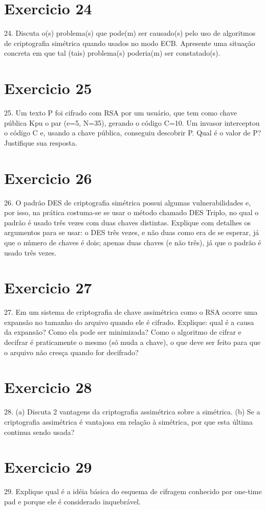 \documentclass[10pt,a4paper]{report}
\begin{document}
\section{Exercicio 24}
24. Discuta o(s) problema(s) que pode(m) ser causado(s) pelo uso de algoritmos de criptografia simétrica quando usados no modo ECB. Apresente uma situação concreta em que tal (tais) problema(s) poderia(m) ser constatado(s).
\section{Exercicio 25}
25. Um texto P foi cifrado com RSA por um usuário, que tem como chave pública Kpu o par (e=5, N=35), gerando o código C=10. Um invasor interceptou o código C e, usando a chave pública, conseguiu descobrir P. Qual é o valor de P? Justifique sua resposta.
\section{Exercicio 26}
26. O padrão DES de criptografia simétrica possui algumas vulnerabilidades e, por isso, na prática costuma-se se usar o método chamado DES Triplo, no qual o padrão é usado três vezes com duas chaves distintas. Explique com detalhes os argumentos para se usar:
o DES três vezes, e não duas como era de se esperar, já que o número de chaves é dois;
apenas duas chaves (e não três), já que o padrão é usado três vezes.
\section{Exercicio 27}
27. Em um sistema de criptografia de chave assimétrica como o RSA ocorre uma expansão no tamanho do arquivo quando ele é cifrado. Explique:
qual é a causa da expansão?
Como ela pode ser minimizada?
Como o algoritmo de cifrar e decifrar é praticamente o mesmo (só muda a chave), o que deve ser feito para que o arquivo não cresça quando for decifrado?
\section{Exercicio 28}
28. (a) Discuta 2 vantagens da criptografia assimétrica sobre a simétrica.
(b) Se a criptografia assimétrica é vantajosa em relação à simétrica, por que esta última continua sendo usada?
\section{Exercicio 29}
29. Explique qual é a idéia básica do esquema de cifragem conhecido por one-time pad e porque ele é considerado inquebrável.
\end{document}
